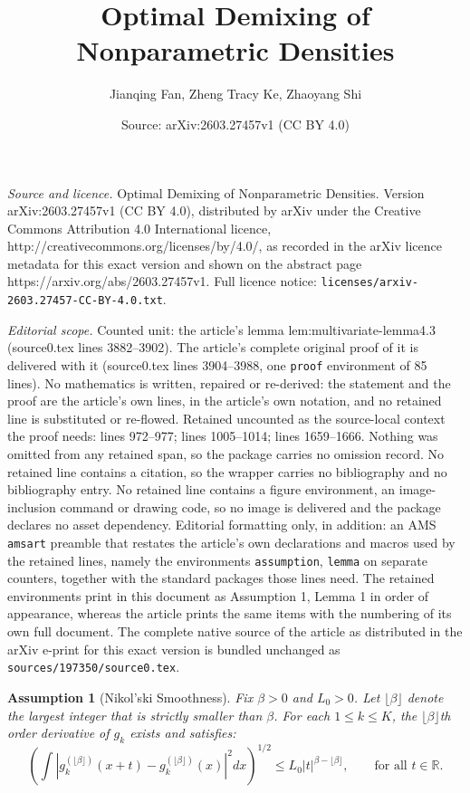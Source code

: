 \documentclass[10pt,a4paper]{amsart}
\title{Optimal Demixing of Nonparametric Densities}
\author{Jianqing Fan, Zheng Tracy Ke, Zhaoyang Shi}
\date{Source: arXiv:2603.27457v1 (CC BY 4.0)}
\newtheorem{assumption}{Assumption}
\begin{document}
\maketitle

\noindent\emph{Source and licence.} Optimal Demixing of Nonparametric Densities. Version arXiv:2603.27457v1 (CC BY 4.0), distributed by arXiv under the Creative Commons Attribution 4.0 International licence, http://creativecommons.org/licenses/by/4.0/, as recorded in the arXiv licence metadata for this exact version and shown on the abstract page https://arxiv.org/abs/2603.27457v1. Full licence notice: \texttt{licenses/arxiv-2603.27457-CC-BY-4.0.txt}.\par\smallskip

\noindent\textit{Editorial scope.} Counted unit: the article's lemma lem:multivariate-lemma4.3 (source0.tex lines 3882--3902). The article's complete original proof of it is delivered with it (source0.tex lines 3904--3988, one \texttt{proof} environment of 85 lines). No mathematics is written, repaired or re-derived: the statement and the proof are the article's own lines, in the article's own notation, and no retained line is substituted or re-flowed.  Retained uncounted as the source-local context the proof needs: lines 972--977; lines 1005--1014; lines 1659--1666.  Nothing was omitted from any retained span, so the package carries no omission record.  No retained line contains a citation, so the wrapper carries no bibliography and no bibliography entry.  No retained line contains a figure environment, an image-inclusion command or drawing code, so no image is delivered and the package declares no asset dependency.  Editorial formatting only, in addition: an AMS \texttt{amsart} preamble that restates the article's own declarations and macros used by the retained lines, namely the environments \texttt{assumption}, \texttt{lemma} on separate counters, together with the standard packages those lines need.  The retained environments print in this document as Assumption 1, Lemma 1 in order of appearance, whereas the article prints the same items with the numbering of its own full document.  The complete native source of the article as distributed in the arXiv e-print for this exact version is bundled unchanged as \texttt{sources/197350/source0.tex}.
\begin{assumption}[Nikol'ski  Smoothness]\label{assump1}
Fix $\beta > 0$ and $L_0>0$. Let $\lfloor\beta\rfloor$ denote the largest integer that is strictly smaller than $\beta$. For each $1\leq k\leq K$, the  $\lfloor\beta\rfloor$th order derivative of $g_k$ exists and satisfies:
  \[
  \left( \int \left| g_k^{(\lfloor\beta\rfloor)}(x + t) - g_k^{(\lfloor\beta\rfloor)}(x) \right|^2 dx \right)^{1/2} \le L_0 |t|^{\beta - \lfloor\beta\rfloor},\qquad\mbox{for all $t\in\mathbb{R}$}.
  \]
\end{assumption}
\end{document}
